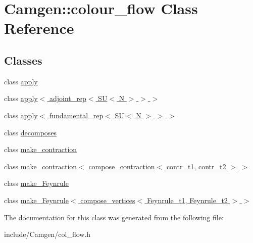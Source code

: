 \hypertarget{a00078}{\section{Camgen\-:\-:colour\-\_\-flow Class Reference}
\label{a00078}
}
\subsection*{Classes}
\begin{DoxyCompactItemize}
\item 
class \hyperlink{a00012}{apply}
\item 
class \hyperlink{a00015}{apply$<$ adjoint\-\_\-rep$<$ S\-U$<$ N $>$ $>$ $>$}
\item 
class \hyperlink{a00016}{apply$<$ fundamental\-\_\-rep$<$ S\-U$<$ N $>$ $>$ $>$}
\item 
class \hyperlink{a00127}{decomposes}
\item 
class \hyperlink{a00338}{make\-\_\-contraction}
\item 
class \hyperlink{a00339}{make\-\_\-contraction$<$ compose\-\_\-contraction$<$ contr\-\_\-t1, contr\-\_\-t2 $>$ $>$}
\item 
class \hyperlink{a00341}{make\-\_\-\-Feynrule}
\item 
class \hyperlink{a00342}{make\-\_\-\-Feynrule$<$ compose\-\_\-vertices$<$ Feynrule\-\_\-t1, Feynrule\-\_\-t2 $>$ $>$}
\end{DoxyCompactItemize}


The documentation for this class was generated from the following file\-:\begin{DoxyCompactItemize}
\item 
include/\-Camgen/col\-\_\-flow.\-h\end{DoxyCompactItemize}

